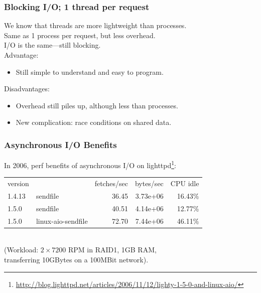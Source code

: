\begin{frame}
  \frametitle{Blocking I/O; 1 thread per request}

  
    We know that threads are more lightweight than processes.\\[1em]

    Same as 1 process per request, but less overhead.\\[1em]

    I/O is the same---still blocking.\\[1em]

    Advantage:
    \begin{itemize}
      \item Still simple to understand and easy to program.
    \end{itemize}

    Disadvantages:
    \begin{itemize}
      \item Overhead still piles up, although less than processes.
      \item New complication: race conditions on shared data.
    \end{itemize}
  
\end{frame}

\begin{frame}
  \frametitle{Asynchronous I/O Benefits}

  
    In 2006, perf benefits of asynchronous I/O on lighttpd\footnote{\tiny \url{http://blog.lighttpd.net/articles/2006/11/12/lighty-1-5-0-and-linux-aio/}}:\\

{\small
    \begin{tabular}{llrrr}
    version & & fetches/sec & bytes/sec & CPU idle \\
    1.4.13 & sendfile & 36.45 & 3.73e+06 & 16.43\% \\
    1.5.0 & sendfile & 40.51 & 4.14e+06 & 12.77\% \\
    1.5.0 & linux-aio-sendfile & 72.70 & 7.44e+06 & 46.11\% \\
    \end{tabular}
}~\\[1em]

    (Workload: $2\times 7200$ RPM in RAID1, 1GB RAM, \\
     \qquad transferring 10GBytes on a 100MBit network).\\[1em]
  
\end{frame}


